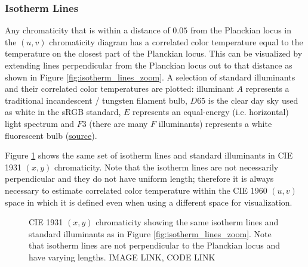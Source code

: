 \documentclass[twocolumn]{article}
\newif\ifinvert
\begin{document}
\subsubsection{Isotherm Lines}
Any chromaticity that is within a distance of $0.05$ from the Planckian locus in the $(u,v)$ chromaticity diagram has a correlated color temperature equal to the temperature on the closest part of the Planckian locus.  This can be visualized by extending lines perpendicular from the Planckian locus out to that distance as shown in Figure \ref{fig:isotherm_lines_zoom}.  A selection of standard illuminants and their correlated color temperatures are plotted: illuminant $A$ represents a traditional incandescent / tungsten filament bulb, $D65$ is the clear day sky used as white in the sRGB standard, $E$ represents an equal-energy (i.e. horizontal) light spectrum and $F3$ (there are many $F$ illuminants) represents a white fluorescent bulb (\href{https://en.wikipedia.org/wiki/Standard_illuminant}{source}).\\
\begin{figure*}[h]
    \ifinvert
        
    \else
        
    \fi
    \caption{CIE 1960 $(u,v)$ chromaticity (zoomed in) showing isotherm lines for selected temperatures along the Planckian locus and standard illuminants $A$, $D65$, $E$, and $F3$.  IMAGE LINK, CODE LINK}\label{fig:isotherm_lines_zoom}
\end{figure*}

Figure \ref{fig:cie_1931_isotherm} shows the same set of isotherm lines and standard illuminants in CIE 1931 $(x,y)$ chromaticity.  Note that the isotherm lines are not necessarily perpendicular and they do not have uniform length; therefore it is always necessary to estimate correlated color temperature within the CIE 1960 $(u,v)$ space in which it is defined even when using a different space for visualization.
\begin{figure}[h]
    \ifinvert
        
    \else
        
    \fi
    \caption{CIE 1931 $(x,y)$ chromaticity showing the same isotherm lines and standard illuminants as in Figure \ref{fig:isotherm_lines_zoom}.  Note that isotherm lines are not perpendicular to the Planckian locus and have varying lengths.  IMAGE LINK, CODE LINK}\label{fig:cie_1931_isotherm}
\end{figure}
\end{document}
